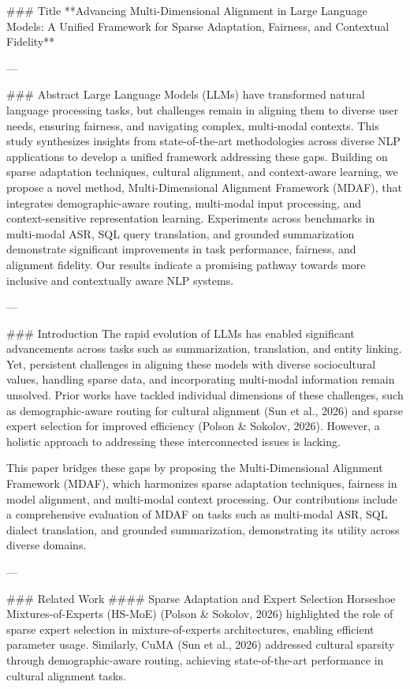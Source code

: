 ### Title  
**Advancing Multi-Dimensional Alignment in Large Language Models: A Unified Framework for Sparse Adaptation, Fairness, and Contextual Fidelity**

---

### Abstract  
Large Language Models (LLMs) have transformed natural language processing tasks, but challenges remain in aligning them to diverse user needs, ensuring fairness, and navigating complex, multi-modal contexts. This study synthesizes insights from state-of-the-art methodologies across diverse NLP applications to develop a unified framework addressing these gaps. Building on sparse adaptation techniques, cultural alignment, and context-aware learning, we propose a novel method, Multi-Dimensional Alignment Framework (MDAF), that integrates demographic-aware routing, multi-modal input processing, and context-sensitive representation learning. Experiments across benchmarks in multi-modal ASR, SQL query translation, and grounded summarization demonstrate significant improvements in task performance, fairness, and alignment fidelity. Our results indicate a promising pathway towards more inclusive and contextually aware NLP systems.

---

### Introduction  
The rapid evolution of LLMs has enabled significant advancements across tasks such as summarization, translation, and entity linking. Yet, persistent challenges in aligning these models with diverse sociocultural values, handling sparse data, and incorporating multi-modal information remain unsolved. Prior works have tackled individual dimensions of these challenges, such as demographic-aware routing for cultural alignment (Sun et al., 2026) and sparse expert selection for improved efficiency (Polson & Sokolov, 2026). However, a holistic approach to addressing these interconnected issues is lacking.

This paper bridges these gaps by proposing the Multi-Dimensional Alignment Framework (MDAF), which harmonizes sparse adaptation techniques, fairness in model alignment, and multi-modal context processing. Our contributions include a comprehensive evaluation of MDAF on tasks such as multi-modal ASR, SQL dialect translation, and grounded summarization, demonstrating its utility across diverse domains.

---

### Related Work  
#### Sparse Adaptation and Expert Selection  
Horseshoe Mixtures-of-Experts (HS-MoE) (Polson & Sokolov, 2026) highlighted the role of sparse expert selection in mixture-of-experts architectures, enabling efficient parameter usage. Similarly, CuMA (Sun et al., 2026) addressed cultural sparsity through demographic-aware routing, achieving state-of-the-art performance in cultural alignment tasks.

